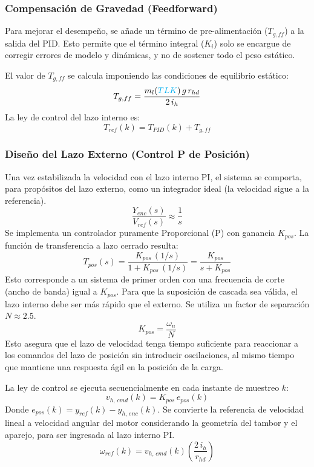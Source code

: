\documentclass[11pt]{article}                                    %
\begin{document}
\subsubsection{Compensación de Gravedad (Feedforward)}
Para mejorar el desempeño, se añade un término de pre-alimentación ($T_{g,ff}$) a la salida del PID. Esto permite que el término integral ($K_i$) solo se encargue de corregir errores de modelo y dinámicas, y no de sostener todo el peso estático.

El valor de $T_{g,ff}$ se calcula imponiendo las condiciones de equilibrio estático:
\begin{equation}
        T_{g,ff} = \frac{m_l(\textcolor{cyan}{TLK}) \, g \, r_{hd}}{2 \, i_h}
\end{equation}
La ley de control del lazo interno es:
\begin{equation}
    T_{ref}(k) = T_{PID}(k) + T_{g,ff}
\end{equation}

\subsubsection{Diseño del Lazo Externo (Control P de Posición)}
Una vez estabilizada la velocidad con el lazo interno PI, el sistema se comporta, para propósitos del lazo externo, como un integrador ideal (la velocidad sigue a la referencia).
\begin{equation}
    \frac{Y_{enc}(s)}{V_{ref}(s)} \approx \frac{1}{s}
\end{equation}
Se implementa un controlador puramente Proporcional (P) con ganancia $K_{pos}$. La función de transferencia a lazo cerrado resulta:
\begin{equation}
    T_{pos}(s) = \frac{K_{pos} \, (1/s)}{1 + K_{pos} \, (1/s)} = \frac{K_{pos}}{s + K_{pos}}
\end{equation}
Esto corresponde a un sistema de primer orden con una frecuencia de corte (ancho de banda) igual a $K_{pos}$. Para que la suposición de cascada sea válida, el lazo interno debe ser más rápido que el externo. Se utiliza un factor de separación $N \approx 2.5$.
\begin{equation}
    K_{pos} = \frac{\omega_n}{N}
\end{equation}
Esto asegura que el lazo de velocidad tenga tiempo suficiente para reaccionar a los comandos del lazo de posición sin introducir oscilaciones, al mismo tiempo que mantiene una respuesta ágil en la posición de la carga.

La ley de control se ejecuta secuencialmente en cada instante de muestreo $k$:
\begin{equation}
    v_{h, \, cmd}(k) = K_{pos} \, e_{pos}(k)
\end{equation}
Donde $e_{pos}(k) = y_{ref}(k) - y_{h,\,enc}(k)$. Se convierte la referencia de velocidad lineal a velocidad angular del motor considerando la geometría del tambor y el aparejo, para ser ingresada al lazo interno PI.
\begin{equation}
    \omega_{ref}(k) = v_{h,\,cmd}(k) \left( \frac{2 \, i_h}{r_{hd}} \right)
\end{equation}
\end{document}
